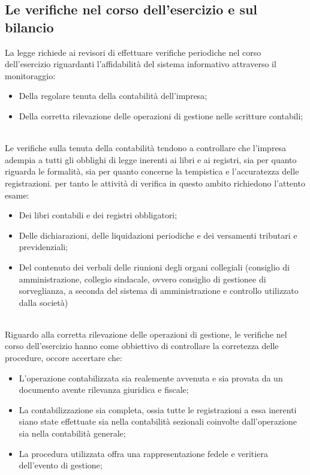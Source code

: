 \documentclass{report}
\begin{document}
\subsection{Le verifiche nel corso dell'esercizio e sul bilancio} %
\label{sub:Le verifiche nel corso dell'esercizio e sul bilancio}
La legge richiede ai revisori di effettuare verifiche periodiche nel corso dell'esercizio riguardanti l'affidabilità del sistema informativo attraverso il monitoraggio:
\\
\begin{itemize}
  \item{Della regolare tenuta della contabilità dell'impresa;}
  \item{Della corretta rilevazione delle operazioni di gestione nelle scritture contabili;}
\end{itemize}
\\
Le verifiche sulla tenuta della contabilità tendono a controllare che l'impresa adempia a tutti gli obblighi di legge inerenti ai libri e ai registri, sia per quanto riguarda le formalità, sia per quanto concerne la tempistica e l'accuratezza delle registrazioni. per tanto le attività di verifica in questo ambito richiedono l'attento esame:
\\
\begin{itemize}
  \item{Dei libri contabili e dei registri obbligatori;}
  \item{Delle dichiarazioni, delle liquidazioni periodiche e dei versamenti tributari e previdenziali;}
  \item{Del contenuto dei verbali delle riunioni degli organi collegiali (consiglio di amministrazione, collegio sindacale, ovvero consiglio di gestionee di sorveglianza, a seconda del sistema di amministrazione e controllo utilizzato dalla società)}
\end{itemize}
\\
Riguardo alla corretta rilevazione delle operazioni di gestione, le verifiche nel corso dell'esercizio hanno come obbiettivo di controllare la corretezza delle procedure, occore accertare che:
\\
\begin{itemize}
  \item{L'operazione contabilizzata sia realemente avvenuta e sia provata da un documento avente rilevanza giuridica e fiscale;}
  \item{La contabilizzazione sia completa, ossia tutte le registrazioni a essa inerenti siano state effettuate sia nella contabilità sezionali coinvolte dall'operazione sia nella contabilità generale;}
  \item{La procedura utilizzata offra una rappresentazione fedele e veritiera dell'evento di gestione;}
\end{itemize}
\end{document}
